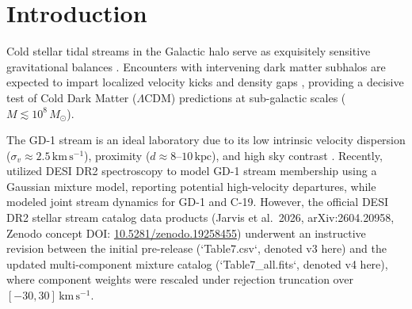 \documentclass[twocolumn]{aastex631}
\begin{document}
\begin{abstract}
without the spur candidate), though the elevation over the trailing ($1.87 \pm 0.32\,\mathrm{km\,s^{-1}}$) and leading ($1.57 \pm 0.30\,\mathrm{km\,s^{-1}}$) arms is modest ($\sim 1.5\text{--}2\sigma$). We conclude that single-epoch velocity tails in GD-1 are heavily contaminated by binaries and envelope stars, while the localized spur excess could reflect subhalo perturbations, cocoon contamination, or undetected binaries (exemplified by the $29\,\mathrm{km\,s^{-1}}$ velocity shift of Gaia 804386042407893376). Dedicated dynamical forward-modeling is required before robust fundamental physics bounds can be inferred.
\end{abstract}


\section{Introduction}
\label{sec:intro}

Cold stellar tidal streams in the Galactic halo serve as exquisitely sensitive gravitational balances \citep{Johnston1996, Helmi2001, Bovy2017, Bonaca2019}. Encounters with intervening dark matter subhalos are expected to impart localized velocity kicks and density gaps \citep{Carlberg2012, Erkal2015, Sanderson2016}, providing a decisive test of Cold Dark Matter ($\Lambda$CDM) predictions at sub-galactic scales ($M \lesssim 10^8\,M_\odot$).

The GD-1 stream \citep{Grillmair2006} is an ideal laboratory due to its low intrinsic velocity dispersion ($\sigma_v \approx 2.5\,\mathrm{km\,s^{-1}}$), proximity ($d \approx 8\text{--}10\,\mathrm{kpc}$), and high sky contrast \citep{PriceWhelan2018, Malhan2018, Koposov2010}. Recently, \citet{Jarvis2026} utilized DESI DR2 spectroscopy to model GD-1 stream membership using a Gaussian mixture model, reporting potential high-velocity departures, while \citet{Carlberg2026} modeled joint stream dynamics for GD-1 and C-19. However, the official DESI DR2 stellar stream catalog data products (Jarvis et al.\ 2026, arXiv:2604.20958, Zenodo concept DOI: \href{https://doi.org/10.5281/zenodo.19258455}{10.5281/zenodo.19258455}) underwent an instructive revision between the initial pre-release (`Table7.csv`, denoted v3 here) and the updated multi-component mixture catalog (`Table7_all.fits`, denoted v4 here), where component weights were rescaled under rejection truncation over $[-30, 30]\,\mathrm{km\,s^{-1}}$.
\end{document}
